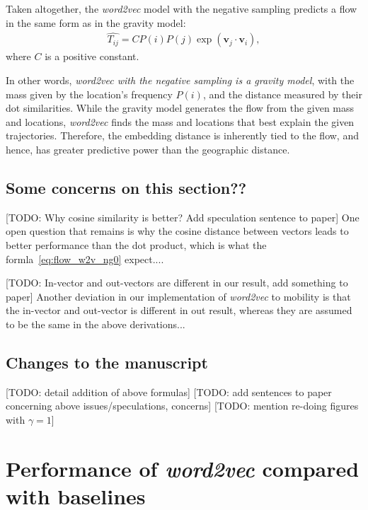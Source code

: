\documentclass[12pt,a4paper]{article}
\newcommand{\todo}[1]{{\leavevmode\color{orange}[TODO: #1]}}
\begin{document}
Taken altogether, the {\it word2vec} model with the negative sampling predicts a flow in the same form as in the gravity model:
\begin{align}
	\hat{T_{ij}}=  C P(i) P(j)  \exp(\bm{v}_j \cdot \bm{v}_{i}), \label{eq:flow_w2v_ng0}
\end{align}
where $C$ is a positive constant.

In other words, \emph{word2vec with the negative sampling is a gravity model}, with the mass given by the location's frequency $P(i)$, and the distance measured by their dot similarities.
While the gravity model generates the flow from the given mass and locations, {\it word2vec} finds the mass and locations that best explain the given trajectories.
Therefore, the embedding distance is inherently tied to the flow, and hence, has greater predictive power than the geographic distance.


\subsection{Some concerns on this section??}
\todo{Why cosine similarity is better? Add speculation sentence to paper}
One open question that remains is why the cosine distance between vectors leads to better performance than the dot product, which is what the formla~\ref{eq:flow_w2v_ng0} expect....

\todo{In-vector and out-vectors are different in our result, add something to paper}
Another deviation in our implementation of \textit{word2vec} to mobility is that the in-vector and out-vector is different in out result, whereas they are assumed to be the same in the above derivations...

\subsection{Changes to the manuscript}
\todo{detail addition of above formulas}
\todo{add sentences to paper concerning above issues/speculations, concerns}
\todo{mention re-doing figures with $\gamma = 1$}



%
%
\section{Performance of \textit{word2vec} compared with baselines}
\end{document}

